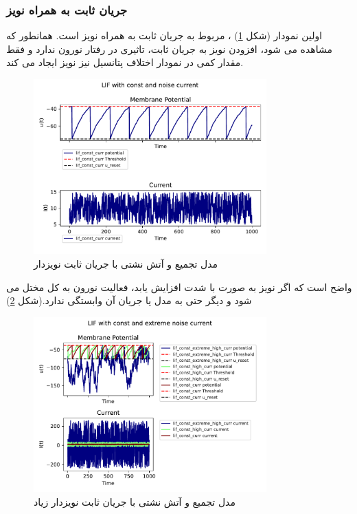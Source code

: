 \documentclass{article}
\begin{document}
            \subsubsection{جریان ثابت به همراه نویز}
                اولین نمودار
                (شکل \ref{fig:lif-const-noise-curr})
                ، مربوط به جریان ثابت به همراه نویز است. همانطور که مشاهده می شود، افزودن نویز به جریان ثابت، تاثیری در رفتار نورون ندارد و فقط مقدار کمی در نمودار اختلاف پتانسیل نیز نویز ایجاد می کند.
                \begin{figure}[H]
                    \centering
                    \includegraphics[width=0.8\textwidth]{plots/LIF with const and noise current.pdf} 
                    \caption{مدل تجمیع و آتش نشتی با جریان ثابت نویزدار}
                    \label{fig:lif-const-noise-curr}
                \end{figure}
                واضح است که اگر نویز به صورت با شدت افزایش یابد، فعالیت نورون به کل مختل می شود و دیگر حتی به مدل یا جریان آن وابستگی ندارد.(شکل \ref{fig:lif-const-noise-extreme-curr})
                \begin{figure}[H]
                    \centering
                    \includegraphics[width=0.8\textwidth]{plots/LIF with const and extreme noise current.pdf} 
                    \caption{مدل تجمیع و آتش نشتی با جریان ثابت نویزدار زیاد}
                    \label{fig:lif-const-noise-extreme-curr}
                \end{figure}
\end{document}
